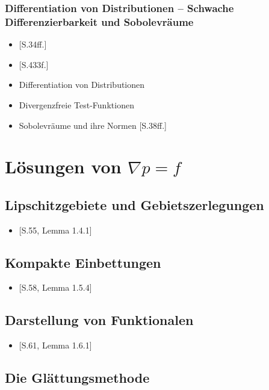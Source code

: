 \subsection{Differentiation von Distributionen -- Schwache Differenzierbarkeit und Sobolevräume}

\begin{itemize}
  \item \cite{sohr2001navier}[S.34ff.]
  \item \cite{werner2011fa}[S.433f.]
  \item Differentiation von Distributionen
  \item Divergenzfreie Test-Funktionen
  \item Sobolevräume und ihre Normen \cite{sohr2001navier}[S.38ff.]
\end{itemize}

\chapter{Lösungen von $\nabla p = f$}
\section{Lipschitzgebiete und Gebietszerlegungen}

\begin{itemize}
  \item \cite{sohr2001navier}[S.55, Lemma 1.4.1]
\end{itemize}

\section{Kompakte Einbettungen}

\begin{itemize}
  \item \cite{sohr2001navier}[S.58, Lemma 1.5.4]
\end{itemize}

\section{Darstellung von Funktionalen}

\begin{itemize}
  \item \cite{sohr2001navier}[S.61, Lemma 1.6.1]
\end{itemize}


\section{Die Glättungsmethode}

